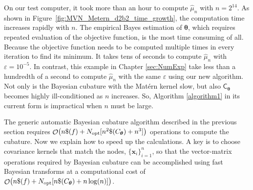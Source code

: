 \documentclass{iitthesis}          %
\DeclareMathOperator{\Order}{{\mathcal O}}
\newcommand{\bm}[1]{\boldsymbol{#1}}
\newcommand{\vtheta}{{\bm{\theta}}}
\newcommand{\vx}{\bm{x}}
\newcommand{\mC}{\mathsf{C}}
\newcommand{\hmu}{\widehat{\mu}}
\newcommand{\opt}{\textup{opt}}
\newcommand\figref{Figure~\ref}
\begin{document}
On our test computer, it took more than an hour to compute $\hmu_n$ with $n=2^{14}$. 
As shown in \figref{fig:MVN_Metern_d2b2_time_growth}, the computation time increases rapidly with $n$. 
The empirical Bayes estimation of $\vtheta$, which requires repeated evaluation of the objective function, is the most time consuming of all. Because the objective function needs to be computed multiple times in every iteration to find its minimum. It takes tens of seconds to compute $\hmu_n$ with $\varepsilon = 10^{-5}$.   In contrast, this example in Chapter \ref{sec:NumExp} take less than a hundredth of a second to compute $\hmu_n$ with the same $\varepsilon$ using our new algorithm. Not only is the Bayesian cubature with the Mat\'ern kernel slow, but also $\mC_\vtheta$ becomes highly ill-conditioned as $n$ increases.
So, Algorithm \ref{algorithm1} in its current form is impractical when $n$ must be large.









\label{sec:fast_BC}



The generic automatic Bayesian cubature algorithm described in the previous section requires $\Order\bigl(n \$(f) +  N_{\opt} [n^2 \$(C_\vtheta) + n^3]\bigr)$ operations to compute the cubature. Now we explain how to speed up the calculations. A key is to choose covariance kernels that match the nodes, $\{\vx_i\}_{i=1}^n$, so that the vector-matrix operations required by Bayesian cubature can be accomplished using fast Bayesian transforms at a computational cost of $\Order\bigl(n \$(f) + N_{\opt} [n \$(C_\vtheta)  + n \log(n)] \bigr)$.
\end{document}
